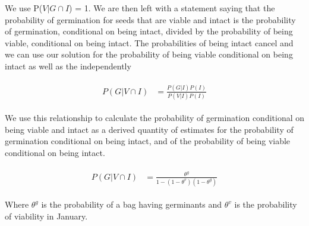 \documentclass[12pt, oneside]{article}   	%
\begin{document}
We use P($V|G \cap I$) = 1. We are then left with a statement saying that the probability of germination for seeds that are viable and intact is the probability of germination, conditional on being intact, divided by the probability of being viable, conditional on being intact. The probabilities of being intact cancel and we can use our solution for the probability of being viable conditional on being intact as well as the independently  
 
    \begin{align}
\begin{split}
	P(G | V \cap I)  &= \frac{ P(G | I)  P(I)}{P(V | I)  P(I) }
  \end{split}
\end{align}

We use this relationship to calculate the probability of germination conditional on being viable and intact as a derived quantity of estimates for the probability of germination conditional on being intact, and of the probability of being viable conditional on being intact. 

    \begin{align}
\begin{split}
	P(G | V \cap I)  &= \frac{ \theta^g }{ 1-(1-\theta^v)(1-\theta^g)}
  \end{split}
\end{align}

Where $\theta^g$ is the probability of a bag having germinants and $\theta^v$ is the probability of viability in January.  
\fi
\end{document}
